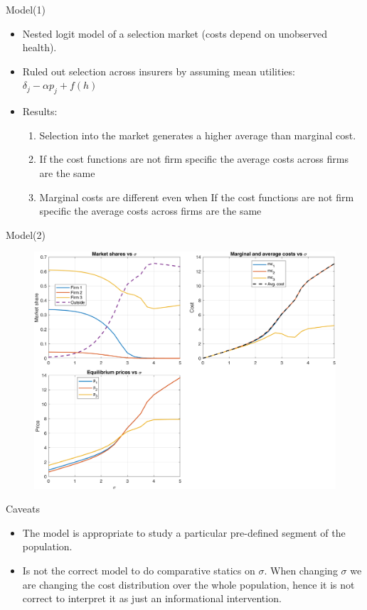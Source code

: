 \documentclass[10pt,aspectratio=169]{beamer}
\begin{document}
\begin{frame}{Model(1)}
\begin{itemize}
    \item Nested logit model of a selection market (costs depend on unobserved health). 
    \item Ruled out selection across insurers by assuming mean utilities: $\delta_j - \alpha p_j + f(h)$
    \item Results: 
    \begin{enumerate}
        \item Selection into the market generates a higher average than marginal cost. 
        \item If the cost functions are not firm specific the average costs across firms are the same 
        \item Marginal costs are different even when 
        If the cost functions are not firm specific the average costs across firms are the same 
    \end{enumerate}
\end{itemize}
\end{frame}


\begin{frame}{Model(2)}
 \begin{figure}
     \centering
     \includegraphics[width=0.6\linewidth]{figures/simulations/sigma_panels.png}
     \label{fig:placeholder}
 \end{figure}
\end{frame}

\begin{frame}{Caveats}
\begin{itemize}
    \item The model is appropriate to study  a particular pre-defined segment of the population.
    \item Is not the correct model to do comparative statics on $\sigma$. When changing $\sigma$ we are changing the cost distribution over the whole population, hence it is not correct to interpret it as just an informational intervention. 
\end{itemize}


\end{frame}



 
\end{document}

